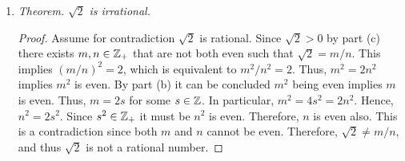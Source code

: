\documentclass[12pt]{article}
\begin{document}
\begin{enumerate}[label=(\alph*)]
\begin{proof}
			Hence, it has been proven that if $a$ is a positive rational number, then $a = m/n$ for 
			some $n, m \in \ZZ_{+}$ where not both $m$ and $n$ are even.
		\end{proof}
		\item \textit{Theorem.} $\sqrt{2}$ \textit{is irrational.}
		\begin{proof}
			Assume for contradiction $\sqrt{2}$ is rational. Since $\sqrt{2} > 0$ by part (c) there
			exists $m, n \in \mathbb{Z}_{+}$ that are not both even such that $\sqrt{2} = m/n$.
			This implies $(m/n)^2 = 2$, which is equivalent to $m^2/n^2 = 2$. Thus, $m^2 = 2n^2$ implies
			$m^2 $ is even. By part (b) it can be concluded $m^2$ being even implies $m$ is even.
			Thus, $m = 2s$ for some $s \in \mathbb{Z}$. In particular, $m^2 = 4s^2 = 2n^2$. Hence,
			$n^2 = 2s^2$. Since $s^2 \in \mathbb{Z}_{+}$ it must be $n^2$ is even. Therefore,
			$n$ is even also. This is a contradiction since both $m$ and $n$ cannot be even.
			Therefore, $\sqrt{2} \neq m/n$, and thus $\sqrt{2}$ is not a rational number.
		\end{proof}
	\end{enumerate}
\end{document}

